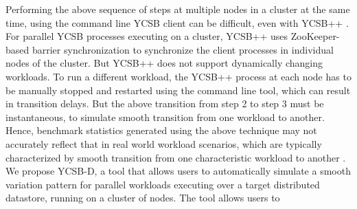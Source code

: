 \documentclass{vldb}
\begin{document}
            \par  Performing the above sequence of steps at multiple nodes in a cluster at the same time, using the command line YCSB client can be difficult, even with YCSB++ \cite{Patil:2011:YBP:2038916.2038925}. 
            For parallel YCSB processes executing on a cluster, YCSB++ uses ZooKeeper-based barrier synchronization to synchronize the client processes in individual nodes of the cluster.
            But YCSB++ does not support dynamically changing workloads. To run a different workload, 
            the YCSB++ process at each node has to be manually stopped and restarted
            using the command line tool, which can result in transition delays.
             But the above transition from step 2 to step 3 must be instantaneous, to simulate smooth transition from one  workload to another.
               Hence, benchmark statistics generated using the above
              technique may not accurately reflect that in real world workload scenarios, which are typically characterized by smooth transition from one
               characteristic workload to another \cite{NetflixWorkload-Variation}. %
              We propose YCSB-D, a tool that allows users to automatically simulate a smooth variation pattern for parallel workloads executing
              over a target distributed datastore, running on a cluster of nodes. The tool allows users to
\end{document}

